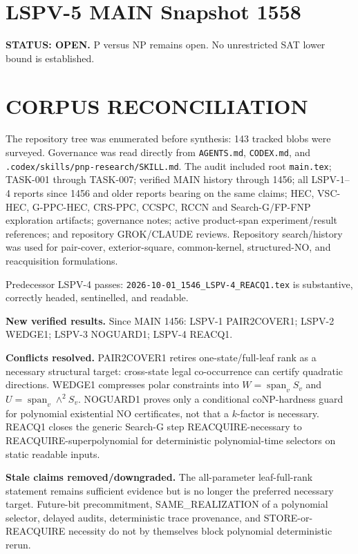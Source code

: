 \documentclass[11pt]{article}
\begin{document}
\section*{LSPV-5 MAIN Snapshot 1558}
\textbf{STATUS: OPEN.} P versus NP remains open. No unrestricted SAT lower bound is established.

\section*{CORPUS RECONCILIATION}
The repository tree was enumerated before synthesis: 143 tracked blobs were surveyed. Governance was read directly from \texttt{AGENTS.md}, \texttt{CODEX.md}, and \texttt{.codex/skills/pnp-research/SKILL.md}. The audit included root \texttt{main.tex}; TASK-001 through TASK-007; verified MAIN history through 1456; all LSPV-1--4 reports since 1456 and older reports bearing on the same claims; HEC, VSC-HEC, G-PPC-HEC, CRS-PPC, CCSPC, RCCN and Search-G/FP-FNP exploration artifacts; governance notes; active product-span experiment/result references; and repository GROK/CLAUDE reviews. Repository search/history was used for pair-cover, exterior-square, common-kernel, structured-NO, and reacquisition formulations.

Predecessor LSPV-4 passes: \texttt{2026-10-01\_1546\_LSPV-4\_REACQ1.tex} is substantive, correctly headed, sentinelled, and readable.

\textbf{New verified results.} Since MAIN 1456: LSPV-1 PAIR2COVER1; LSPV-2 WEDGE1; LSPV-3 NOGUARD1; LSPV-4 REACQ1.

\textbf{Conflicts resolved.} PAIR2COVER1 retires one-state/full-leaf rank as a necessary structural target: cross-state legal co-occurrence can certify quadratic directions. WEDGE1 compresses polar constraints into \(W=\operatorname{span}_vS_v\) and \(U=\operatorname{span}_v\wedge^2S_v\). NOGUARD1 proves only a conditional coNP-hardness guard for polynomial existential NO certificates, not that a \(k\)-factor is necessary. REACQ1 closes the generic Search-G step REACQUIRE-necessary to REACQUIRE-superpolynomial for deterministic polynomial-time selectors on static readable inputs.

\textbf{Stale claims removed/downgraded.} The all-parameter leaf-full-rank statement remains sufficient evidence but is no longer the preferred necessary target. Future-bit precommitment, SAME\_REALIZATION of a polynomial selector, delayed audits, deterministic trace provenance, and STORE-or-REACQUIRE necessity do not by themselves block polynomial deterministic rerun.
\end{document}
